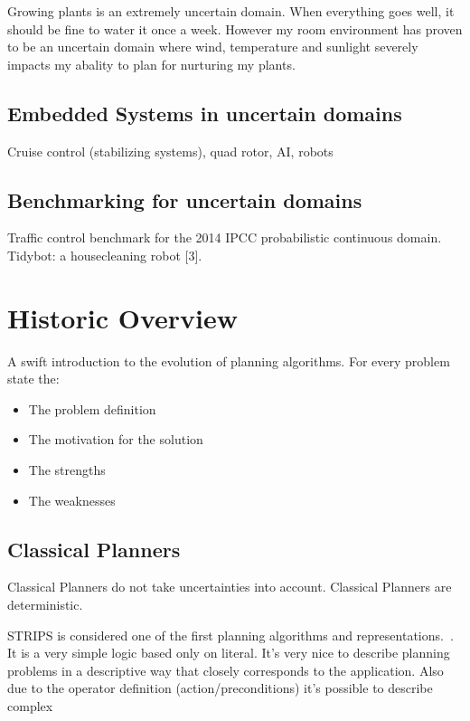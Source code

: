 \documentclass[runningheads,a4paper]{llncs}
\begin{document}
Growing plants is an extremely uncertain domain. When everything goes well, it should be fine to water it once a week. However my room environment has proven to be an uncertain domain where wind, temperature and sunlight severely impacts my abality to plan for nurturing my plants.

\subsection{Embedded Systems in uncertain domains}

Cruise control (stabilizing systems), quad rotor, AI, robots

\subsection{Benchmarking for uncertain domains}

Traffic control benchmark for the 2014 IPCC probabilistic continuous domain.
Tidybot: a housecleaning robot [3]. \\


\section{Historic Overview}
A swift introduction to the evolution of planning algorithms. For every problem state the:
\begin{itemize}
	\item The problem definition
	\item The motivation for the solution
	\item The strengths
	\item The weaknesses
\end{itemize}

\subsection{Classical Planners}

Classical Planners do not take uncertainties into account. Classical Planners
are deterministic.

STRIPS is considered one of the first planning algorithms and
representations.~\cite{lavalle2006planning}. It is a very simple logic based
only on literal. It's very nice to describe planning problems in a
descriptive way that closely corresponds to the application. Also due to the
operator definition (action/preconditions) it's possible to describe complex
\end{document}
